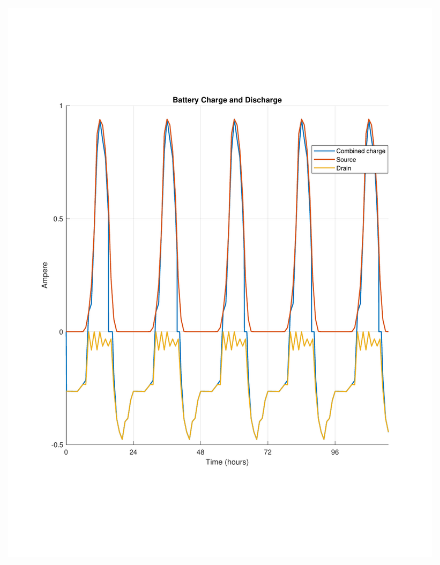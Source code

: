 \begin{figure}[H]
    \centering
    \begin{minipage}[t]{0.655\textwidth} %
        \centering
        \includegraphics[width=\linewidth]{photos/Winter_charge_with_all_loss_5Days.pdf} %
    \end{minipage}%
    \hspace{0.01\textwidth}%
    \begin{minipage}[t]{0.33\textwidth} %
        \centering

\end{minipage}
\end{figure}
